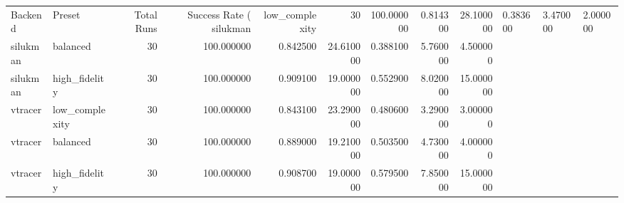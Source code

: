 \begin{tabular}{llrrrrrrr}
\toprule
Backend & Preset & Total Runs & Success Rate (%
\midrule
silukman & low_complexity & 30 & 100.000000 & 0.814300 & 28.100000 & 0.383600 & 3.470000 & 2.000000 \\
silukman & balanced & 30 & 100.000000 & 0.842500 & 24.610000 & 0.388100 & 5.760000 & 4.500000 \\
silukman & high_fidelity & 30 & 100.000000 & 0.909100 & 19.000000 & 0.552900 & 8.020000 & 15.000000 \\
vtracer & low_complexity & 30 & 100.000000 & 0.843100 & 23.290000 & 0.480600 & 3.290000 & 3.000000 \\
vtracer & balanced & 30 & 100.000000 & 0.889000 & 19.210000 & 0.503500 & 4.730000 & 4.000000 \\
vtracer & high_fidelity & 30 & 100.000000 & 0.908700 & 19.000000 & 0.579500 & 7.850000 & 15.000000 \\
\bottomrule
\end{tabular}
